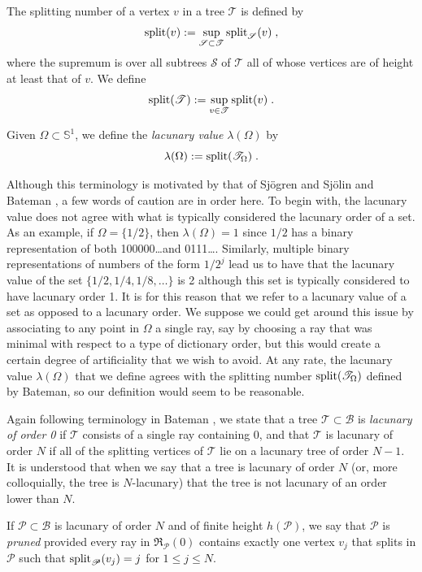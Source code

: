 \documentclass[12pt]{amsart}
\numberwithin{equation}{section}
\theoremstyle{definition}
\theoremstyle{remark}
\begin{document}
 The splitting number of a vertex $v$ in a tree $\mathscr{T}$ is defined by
$$\textup{split}(v) := \sup_{\mathscr{S} \subset \mathscr{T}} \textup{split}_\mathscr{S} (v)\;,$$ where the supremum is over all subtrees $\mathscr{S}$ of $\mathscr{T}$ all of whose vertices are of height at least that of $v$.   We define 
$$\textup{split} (\mathscr{T}) := \sup_{v \in \mathscr{T}} \textup{split}(v)\;.$$

Given $\Omega \subset \mathbb{S}^{1}$, we define the \emph{lacunary value} $\lambda(\Omega)$ by
$$\lambda(\Omega) := \textup{split}(\mathscr{T}_\Omega)\;.$$

Although this terminology is motivated by that of Sj\"ogren and  Sj\"olin \cite{sjsj} and Bateman \cite{Ba}, a few words of caution are in order here.  To begin with, the lacunary value does not agree with what is typically considered the lacunary order of a set.   As an example, if $\Omega = \{1/2\}$, then $\lambda(\Omega) = 1$ since $1/2$ has a binary representation of both 100000\ldots \;and \mbox{0111\ldots .}  Similarly, multiple binary representations of numbers of the form $1 / 2^j$ lead us to have that the lacunary value of the set $\{1/2, 1/4, 1/8, \ldots\}$ is 2 although this set is typically considered to have lacunary order 1.   It is for this reason that we refer to a lacunary value of a set as opposed to a lacunary order.   We suppose we could get around this issue by associating to any point in $\Omega$ a single ray, say by choosing a ray that was minimal with respect to a type of dictionary order, but this would create a certain degree of artificiality that we wish to avoid.  At any rate, the lacunary value $\lambda(\Omega)$ that we define agrees with the splitting number $\textup{split} (\mathscr{T}_\Omega)$ defined by Bateman, so our definition would seem to be reasonable. 

Again following terminology in Bateman \cite{Ba}, we state that a tree $\mathscr{T} \subset \mathscr{B}$ is \emph{lacunary of order 0} if $\mathscr{T}$ consists of a single ray containing 0, and that $\mathscr{T}$ is lacunary of order $N$ if all of the splitting vertices of $\mathscr{T}$ lie on a lacunary tree of order $N-1$.   It is understood that when we say that a tree is lacunary of order $N$ (or, more colloquially, the tree is $N$-lacunary) that the tree is not lacunary of an order lower than $N$.

If $\mathscr{P} \subset \mathscr{B}$ is lacunary of order $N$ and of finite height $h(\mathscr{P})$, we say that $\mathscr{P}$ is \emph{pruned} provided every ray in $\mathfrak{R}_{\mathscr{P}}(0)$ contains exactly one vertex $v_j$ that splits in $\mathscr{P}$ such that $\textup{split}_\mathscr{P}(v_j) = j$ for $1 \leq j \leq N$. 
\end{document}

